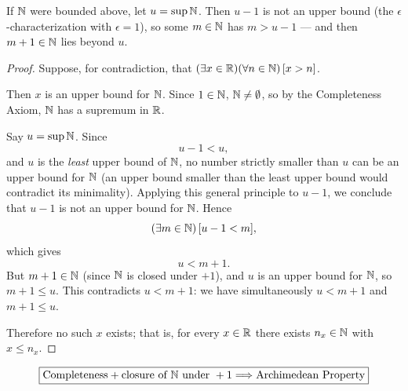 \begin{idea}
    If $\mathbb{N}$ were bounded above, let $u=\sup\mathbb{N}$. Then $u-1$ is not an upper bound (the $\epsilon$-characterization with $\epsilon=1$), so some $m\in\mathbb{N}$ has $m>u-1$ --- and then $m+1\in\mathbb{N}$ lies beyond $u$.
\end{idea}
\begin{proof}
    Suppose, for contradiction, that $(\exists x \in \mathbb{R})(\forall n \in \mathbb{N})\,[x > n]$.

    Then $x$ is an upper bound for $\mathbb{N}$. Since $1 \in \mathbb{N}$, $\mathbb{N} \neq \emptyset$, so by the Completeness Axiom, $\mathbb{N}$ has a supremum in $\mathbb{R}$.

    Say $u = \sup \mathbb{N}$. Since
    \begin{equation*}
        u - 1 < u,
    \end{equation*}
    and $u$ is the \emph{least} upper bound of $\mathbb{N}$, no number strictly smaller than $u$ can be an upper bound for $\mathbb{N}$ (an upper bound smaller than the least upper bound would contradict its minimality). Applying this general principle to $u-1$, we conclude that $u - 1$ is not an upper bound for $\mathbb{N}$. Hence
    \begin{equation*}
        (\exists m \in \mathbb{N})\,[u - 1 < m],
    \end{equation*}
    which gives
    \begin{equation*}
        u < m + 1.
    \end{equation*}
    But $m + 1 \in \mathbb{N}$ (since $\mathbb{N}$ is closed under $+1$), and $u$ is an upper bound for $\mathbb{N}$, so $m + 1 \leq u$. This contradicts $u < m+1$: we have simultaneously $u < m+1$ and $m+1 \leq u$.

    Therefore no such $x$ exists; that is, for every $x \in \mathbb{R}$ there exists $n_x \in \mathbb{N}$ with $x \leq n_x$.
\end{proof}

\[
    \boxed{\text{Completeness} + \text{closure of }\mathbb{N}\text{ under }+1 \Longrightarrow \text{Archimedean Property}}
\]


